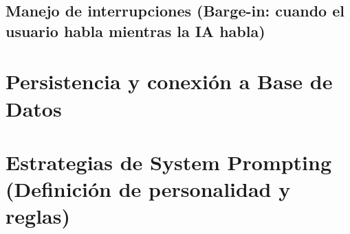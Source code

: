 \subsection{Manejo de interrupciones (Barge-in: cuando el usuario habla mientras la IA habla)}
\label{subsec:barge_in}

\textoBase

\section{Persistencia y conexión a Base de Datos}
\label{sec:persistencia_bd}

\textoBaseAlt

\section{Estrategias de System Prompting (Definición de personalidad y reglas)}
\label{sec:system_prompting}

\textoBase

